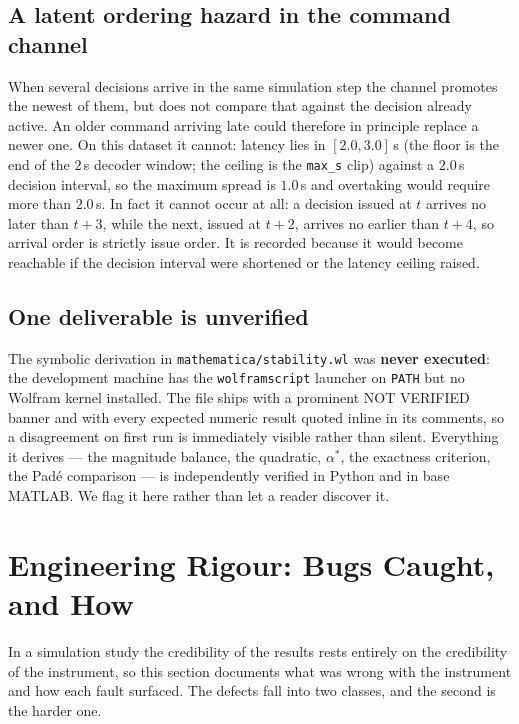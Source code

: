\documentclass[11pt,a4paper]{article}
\newcommand{\astar}{\alpha^{*}}
\theoremstyle{plain}
\theoremstyle{definition}
\begin{document}
\subsection{A latent ordering hazard in the command channel}

When several decisions arrive in the same simulation step the channel
promotes the newest of them, but does not compare that against the
decision already active. An older command arriving late could therefore
in principle replace a newer one. On this dataset it cannot: latency lies
in $[2.0, 3.0]$\,s (the floor is the end of the $2$\,s decoder window;
the ceiling is the \texttt{max\_s} clip) against a $2.0$\,s decision
interval, so the
maximum spread is $1.0$\,s and overtaking would require more than
$2.0$\,s. In fact it cannot occur at all: a decision issued at $t$ arrives
no later than $t + 3$, while the next, issued at $t + 2$, arrives no
earlier than $t + 4$, so arrival order is strictly issue order. It is
recorded because it would become reachable if the decision interval were
shortened or the latency ceiling raised.

\subsection{One deliverable is unverified}

The symbolic derivation in \texttt{mathematica/stability.wl} was
\textbf{never executed}: the development machine has the
\texttt{wolframscript} launcher on \texttt{PATH} but no Wolfram kernel
installed. The file ships with a prominent NOT VERIFIED banner and with
every expected numeric result quoted inline in its comments, so a
disagreement on first run is immediately visible rather than silent.
Everything it derives --- the magnitude balance, the quadratic, $\astar$,
the exactness criterion, the Pad\'e comparison --- is independently
verified in Python and in base MATLAB. We flag it here rather than let a
reader discover it.

\section{Engineering Rigour: Bugs Caught, and How}
\label{sec:bugs}

In a simulation study the credibility of the results rests entirely on
the credibility of the instrument, so this section documents what was
wrong with the instrument and how each fault surfaced. The defects fall
into two classes, and the second is the harder one.
\end{document}
